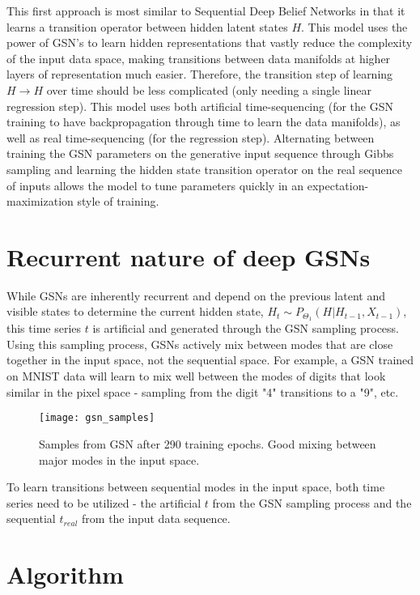 This first approach is most similar to Sequential Deep Belief Networks in that it learns a transition operator between hidden latent states \(H\). This model uses the power of GSN's to learn hidden representations that vastly reduce the complexity of the input data space, making transitions between data manifolds at higher layers of representation much easier. Therefore, the transition step of learning \(H \rightarrow H\) over time should be less complicated (only needing a single linear regression step). This model uses both artificial time-sequencing (for the GSN training to have backpropagation through time to learn the data manifolds), as well as real time-sequencing (for the regression step). Alternating between training the GSN parameters on the generative input sequence through Gibbs sampling and learning the hidden state transition operator on the real sequence of inputs allows the model to tune parameters quickly in an expectation-maximization style of training.



\section{Recurrent nature of deep GSNs}

While GSNs are inherently recurrent and depend on the previous latent and visible states to determine the current hidden state, \(H_{t} \sim P_{\Theta_1}(H|H_{t-1},X_{t-1})\), this time series \(t\) is artificial and generated through the GSN sampling process. Using this sampling process, GSNs actively mix between modes that are close together in the input space, not the sequential space. For example, a GSN trained on MNIST data will learn to mix well between the modes of digits that look similar in the pixel space - sampling from the digit "4" transitions to a "9", etc.

\begin{figure}[h!]
  \centering
    \texttt{[image: gsn\_samples]}
\caption{Samples from GSN after 290 training epochs. Good mixing between major modes in the input space.}
\end{figure}

To learn transitions between sequential modes in the input space, both time series need to be utilized - the artificial \(t\) from the GSN sampling process and the sequential \(t_{real}\) from the input data sequence.


\section{Algorithm}

